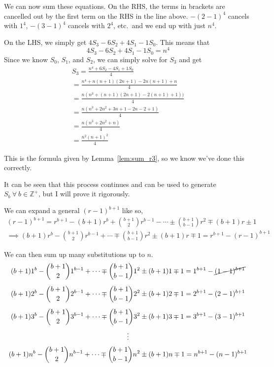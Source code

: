 \documentclass[a4paper]{article}
\newcommand{\zp}{\mathbb{Z}^+}
\begin{document}
We can now sum these equations. On the RHS, the terms in brackets are cancelled out by the first term on the RHS in the line above. $-(2-1)^4$ cancels with $1^4$, $-(3-1)^4$ cancels with $2^4$, etc.\ and we end up with just $n^4$.

On the LHS, we simply get $4S_3 - 6S_2 + 4S_1 - 1S_0$. This means that $$4S_3 - 6S_2 + 4S_1 - 1S_0 = n^4$$ Since we know $S_0$, $S_1$, and $S_2$, we can simply solve for $S_3$ and get
\begin{gather*}
S_3 = \frac{n^4 + 6S_2 - 4S_1 + 1S_0}{4}\\[0.5em]
= \frac{n^4 + n(n+1)(2n+1) - 2n(n+1) + n}{4}\\[0.5em]
= \frac{n(n^3 + (n+1)(2n+1) - 2(n+1) + 1))}{4}\\[0.5em]
= \frac{n(n^3 + 2n^2 + 3n + 1 - 2n - 2 + 1)}{4}\\[0.5em]
= \frac{n(n^3 + 2n^2 + n)}{4}\\[0.5em]
= \frac{n^2(n+1)^2}{4}
\end{gather*}

This is the formula given by Lemma~\ref{lem:sum_r3}, so we know we've done this correctly.

It can be seen that this process continues and can be used to generate $S_b\ \forall\ b \in \zp$, but I will prove it rigorously.

We can expand a general $(r-1)^{b+1}$ like so,
\begin{gather*}
(r-1)^{b+1} = r^{b+1} - (b+1)r^b + \binom{b+1}{2}r^{b-1} - \cdots \pm \binom{b+1}{b-1}r^2 \mp (b+1)r \pm 1\\[0.5em]
\implies (b+1)r^b - \binom{b+1}{2}r^{b-1} + \cdots \mp \binom{b+1}{b-1}r^2 \pm (b+1)r \mp 1 = r^{b+1} - (r-1)^{b+1}
\end{gather*}

We can then sum up many substitutions up to $n$.
\begin{gather*}
(b+1)1^b - \binom{b+1}{2}1^{b-1} + \cdots \mp \binom{b+1}{b-1}1^2 \pm (b+1)1 \mp 1 = 1^{b+1} - \cancel{(1-1)^{b+1}}\\[0.5em]
(b+1)2^b - \binom{b+1}{2}2^{b-1} + \cdots \mp \binom{b+1}{b-1}2^2 \pm (b+1)2 \mp 1 = 2^{b+1} - (2-1)^{b+1}\\[0.5em]
(b+1)3^b - \binom{b+1}{2}3^{b-1} + \cdots \mp \binom{b+1}{b-1}3^2 \pm (b+1)3 \mp 1 = 3^{b+1} - (3-1)^{b+1}\\[0.2em]
\vdots\\[0.2em]
(b+1)n^b - \binom{b+1}{2}n^{b-1} + \cdots \mp \binom{b+1}{b-1}n^2 \pm (b+1)n \mp 1 = n^{b+1} - (n-1)^{b+1}
\end{gather*}
\end{document}
